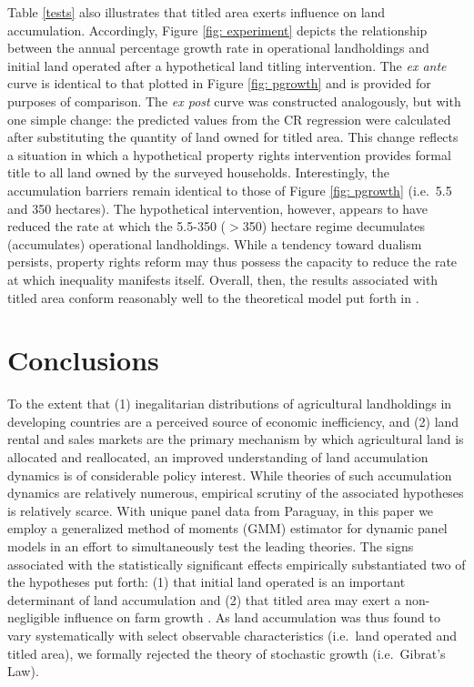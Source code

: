 \documentclass[english]{article}
\begin{document}
Table \ref{tests} also illustrates that titled area exerts influence on land
accumulation. 
Accordingly, Figure \ref{fig: experiment} depicts the relationship between 
the annual percentage growth rate in operational landholdings and initial land 
operated after a hypothetical land titling intervention.
The \emph{ex ante} curve is identical to that plotted in Figure 
\ref{fig: pgrowth} and is provided for purposes of comparison.
The \emph{ex post} curve was constructed analogously, but with one
simple change: the predicted values from the CR regression were calculated
after substituting the quantity of land owned for titled area.
This change reflects a situation in which a hypothetical property rights 
intervention provides formal title to all land owned by the surveyed
households.
Interestingly, the accumulation barriers remain identical to those of Figure
\ref{fig: pgrowth} (i.e.\ 5.5 and 350 hectares).
The hypothetical intervention, however, appears to have reduced the rate at
which the 5.5-350 ($>$350) hectare regime decumulates (accumulates) 
operational landholdings.
While a tendency toward dualism persists, property rights reform may 
thus possess the capacity to reduce the rate at which inequality 
manifests itself. 
Overall, then, the results associated with titled area conform reasonably well 
to the theoretical model put forth in \citet{carter1998b}.


\section{Conclusions}
\label{sec: conclusions}

To the extent that (1) inegalitarian distributions of agricultural landholdings in 
developing countries are a perceived source of economic inefficiency, and 
(2) land rental and sales markets are the primary mechanism by which 
agricultural land is allocated and reallocated, an improved understanding of 
land accumulation dynamics is of considerable policy interest.
While theories of such accumulation dynamics are relatively numerous, 
empirical scrutiny of the associated hypotheses is relatively scarce.
With unique panel data from Paraguay, in this paper we employ a 
generalized method of moments (GMM) estimator for dynamic panel 
models in an effort to simultaneously test the leading theories.
The signs associated with the statistically significant effects 
empirically substantiated two of the hypotheses put forth: (1) that initial land 
operated is an important determinant of land accumulation 
\citep{carter1993} and (2) that titled area may exert a non-negligible 
influence on farm growth \citep{carter1998b}.
As land accumulation was thus found to vary systematically with select 
observable characteristics (i.e.\ land operated and titled area), we formally 
rejected the theory of stochastic growth (i.e.\ Gibrat's Law).
\end{document}
